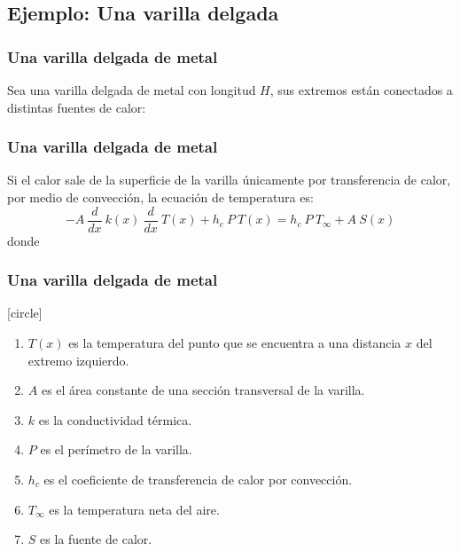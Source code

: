 \subsection{Ejemplo: Una varilla delgada}
\begin{frame}
\frametitle{Una varilla delgada de metal}
Sea una varilla delgada de metal con longitud $H$, sus extremos están conectados a distintas fuentes de calor:
\begin{center}
\end{center}
\end{frame}
\begin{frame}
\frametitle{Una varilla delgada de metal}
Si el calor sale de la superficie de la varilla únicamente por transferencia de calor, por medio de convección, la ecuación de temperatura es:
\[ -A \: \dfrac{d}{dx} \: k(x) \: \dfrac{d}{dx} \: T(x) + h_{c} \: P \: T(x) = h_{c} \: P \: T_{\infty} + A \: S(x)\]
donde
\end{frame}
\begin{frame}
\frametitle{Una varilla delgada de metal}
[circle]
\begin{enumerate}[<+->]
\item $T(x)$ es la temperatura del punto que se encuentra a una distancia $x$ del extremo izquierdo.
\item $A$ es el área constante de una sección transversal de la varilla.
\item $k$ es la conductividad térmica.
\item $P$ es el perímetro de la varilla.
\item $h_{c}$ es el coeficiente de transferencia de calor por convección.
\item $T_{\infty}$ es la temperatura neta del aire.
\item $S$ es la fuente de calor.
\end{enumerate}
\end{frame}
